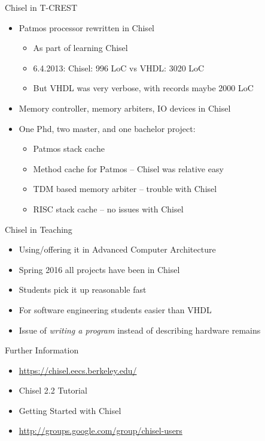 \documentclass[xcolor=pdflatex,dvipsnames,table]{beamer}
\begin{document}
\begin{frame}[fragile]{Chisel in T-CREST}
\begin{itemize}
\item Patmos processor rewritten in Chisel
\begin{itemize}
\item As part of learning Chisel
\item 6.4.2013: Chisel: 996 LoC vs VHDL: 3020 LoC
\item But VHDL was very verbose, with records maybe 2000 LoC
\end{itemize}
\item Memory controller, memory arbiters, IO devices in Chisel
\item One Phd, two master, and one bachelor project:
\begin{itemize}
\item Patmos stack cache
\item Method cache for Patmos -- Chisel was relative easy
\item TDM based memory arbiter -- trouble with Chisel
\item RISC stack cache -- no issues with Chisel
\end{itemize}
\end{itemize}
\end{frame}

\begin{frame}[fragile]{Chisel in Teaching}
\begin{itemize}
\item Using/offering it in Advanced Computer Architecture
\item Spring 2016 all projects have been in Chisel
\item Students pick it up reasonable fast
\item For software engineering students easier than VHDL
\item Issue of \emph{writing a program} instead of describing hardware remains
\end{itemize}
\end{frame}

\begin{frame}[fragile]{Further Information}
\begin{itemize}
\item \url{https://chisel.eecs.berkeley.edu/}
\item Chisel 2.2 Tutorial
\item Getting Started with Chisel
\item \url{http://groups.google.com/group/chisel-users}
\end{itemize}
\end{frame}
\end{document}
